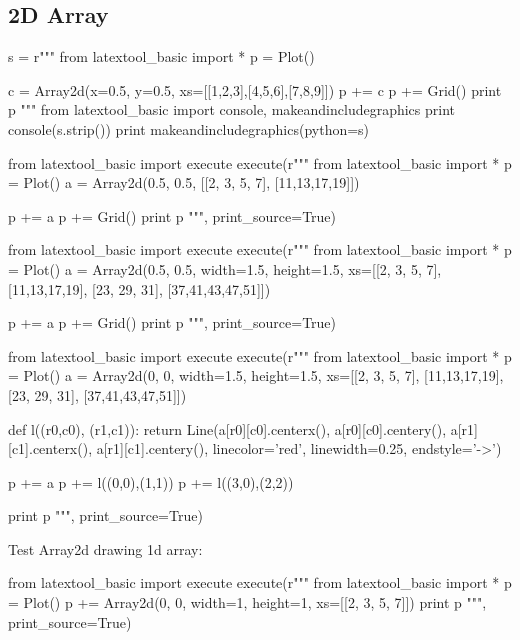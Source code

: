 \subsection{2D Array}

\begin{samepage}
\begin{python}
s = r"""
from latextool_basic import *
p = Plot()

c = Array2d(x=0.5, y=0.5, xs=[[1,2,3],[4,5,6],[7,8,9]])
p += c
p += Grid()
print p
"""
from latextool_basic import console, makeandincludegraphics
print console(s.strip())
print makeandincludegraphics(python=s)
\end{python}
\end{samepage}


\begin{python}
from latextool_basic import execute
execute(r"""
from latextool_basic import *
p = Plot()
a = Array2d(0.5, 0.5, [[2, 3, 5, 7], [11,13,17,19]])

p += a 
p += Grid()
print p
""", print_source=True)
\end{python}


\begin{python}
from latextool_basic import execute
execute(r"""
from latextool_basic import *
p = Plot()
a = Array2d(0.5, 0.5, width=1.5, height=1.5, xs=[[2, 3, 5, 7], [11,13,17,19], [23, 29, 31], [37,41,43,47,51]])

p += a
p += Grid() 
print p
""", print_source=True)
\end{python}


\begin{python}
from latextool_basic import execute
execute(r"""
from latextool_basic import *
p = Plot()
a = Array2d(0, 0, width=1.5, height=1.5, xs=[[2, 3, 5, 7], [11,13,17,19], [23, 29, 31], [37,41,43,47,51]])

def l((r0,c0), (r1,c1)):
    return Line(a[r0][c0].centerx(), a[r0][c0].centery(),
           a[r1][c1].centerx(), a[r1][c1].centery(),
           linecolor='red', linewidth=0.25, endstyle='->')

p += a
p += l((0,0),(1,1))
p += l((3,0),(2,2))

print p
""", print_source=True)
\end{python}


Test Array2d drawing 1d array:
\begin{python}
from latextool_basic import execute
execute(r"""
from latextool_basic import *
p = Plot()
p += Array2d(0, 0, width=1, height=1, xs=[[2, 3, 5, 7]])
print p
""", print_source=True)
\end{python}

